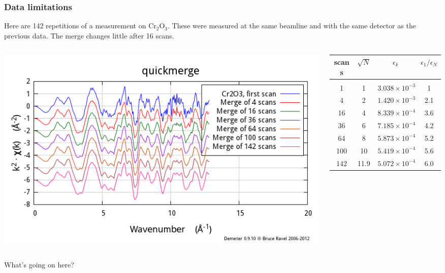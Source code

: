 \documentclass[10pt, xcolor=x11names, compress]{beamer}
\begin{document}
\begin{frame}
  \frametitle{Data limitations}
  Here are 142 repetitions of a measurement on Cr$_2$O$_3$.  These
  were measured at the same beamline and with the same detector as the
  previous data.  The merge changes little after 16 scans.

  \bigskip

  \begin{columns}[T]
    \begin{column}{0.5\linewidth}
      \includegraphics[width=\linewidth]{images/cr2o3.png}
    \end{column}
    \begin{column}{0.5\linewidth}
      \small
      \begin{tabular}[h]{cccc}
        scans & $\sqrt{N}$ & $\epsilon_k$ & $\epsilon_1/\epsilon_N$ \\
        \hline\\
        1   & 1  & $3.038\times 10^{-3}$ & 1 \\
        4   & 2  & $1.420\times 10^{-3}$ & 2.1 \\
        16  & 4  & $8.339\times 10^{-4}$ & 3.6 \\
        36  & 6  & $7.185\times 10^{-4}$ & 4.2 \\
        64  & 8  & $5.873\times 10^{-4}$ & 5.2 \\
        100 & 10 & $5.419\times 10^{-4}$ & 5.6 \\
        142 & 11.9 & $5.072\times 10^{-4}$ & 6.0
      \end{tabular}
    \end{column}
  \end{columns}

  \bigskip

  \begin{alertblock}{}
    \centering What's going on here?
  \end{alertblock}
\end{frame}
\end{document}
